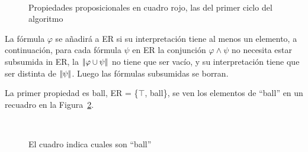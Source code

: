 \begin{figure}[ht]
\begin{center}
\\[0pt]
\caption{Propiedades proposicionales en cuadro rojo, las del primer ciclo del algoritmo}
\label{fig-modelo2}
\end{center}
\end{figure}

La f\'ormula $\varphi$ se a\~nadir\'a a ER si su interpretaci\'on tiene al menos un elemento, a continuaci\'on, para cada f\'ormula
 $\psi$ en ER la conjunci\'on
$\varphi  \wedge \psi$ no necesita estar subsumida in ER, la $|\!|\varphi \cup \psi|\!|$ no tiene que ser vac\'io, y su interpretaci\'on tiene que ser distinta de $|\!|\psi|\!|$. Luego las f\'ormulas subsumidas se borran.

La primer propiedad es \textsf{ball}, ER = \{$\top$, \textsf{ball}\}, se ven los elementos de ``ball'' en un recuadro en la Figura~\ref{fig-modelo3}.

\begin{figure}[ht]
\begin{center}
\\[0pt]
\caption{El cuadro indica cuales son ``ball''}
\label{fig-modelo3}
\end{center}
\end{figure}

